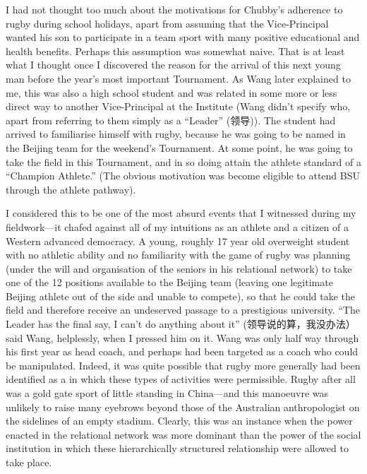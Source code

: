 \begin{CJK}{UTF8}{gbsn}
I had not thought too much about the motivations for Chubby's adherence to rugby during school holidays, apart from assuming that the Vice-Principal wanted his son to participate in a team sport with many positive educational and health benefits.  Perhaps this assumption was somewhat naive.  That is at least what I thought once I discovered the reason for the arrival of this next young man before the year's most important Tournament.  As Wang later explained to me, this was also a high school student and was related in some more or less direct way to another Vice-Principal at the Institute (Wang didn't specify who, apart from referring to them simply as a ``Leader'' (领导)).  The student had arrived to familiarise himself with rugby, because he was going to be named in the Beijing team for the weekend's Tournament.  At some point, he was going to take the field in this Tournament, and in so doing attain the athlete standard of a ``Champion Athlete.''  (The obvious motivation was become eligible to attend BSU through the athlete pathway).

I considered this to be one of the most absurd events that I witnessed during my fieldwork---it chafed against all of my intuitions as an athlete and a citizen of a Western advanced democracy.  A young, roughly 17 year old overweight student with no athletic ability and no familiarity with the game of rugby was planning (under the will and organisation of the seniors in his relational network) to take one of the 12 positions available to the Beijing team (leaving one legitimate Beijing athlete out of the side and unable to compete), so that he could take the field and therefore receive an undeserved passage to a prestigious university.  ``The Leader has the final say, I can't do anything about it'' (领导说的算，我没办法）said Wang, helplessly, when I pressed him on it.  Wang was only half way through his first year as head coach, and perhaps had been targeted as a coach who could be manipulated.  Indeed, it was quite possible that rugby more generally had been identified as a in which these types of activities were permissible.  Rugby after all was a gold gate sport of little standing in China---and this manoeuvre was unlikely to raise many eyebrows beyond those of the Australian anthropologist on the sidelines of an empty stadium. Clearly, this was an instance when the power enacted in the relational network was more dominant than the power of the social institution in which these hierarchically structured relationship were allowed to take place.




\end{CJK}
